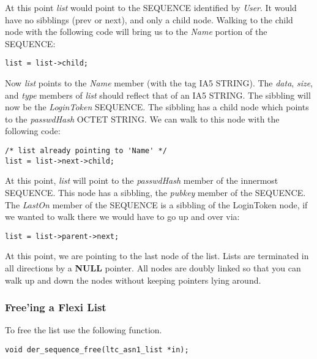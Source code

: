 \documentclass[synpaper]{book}
\begin{document}
At this point \textit{list} would point to the SEQUENCE identified by \textit{User}.  It would have no sibblings (prev or next), and only a child node.  Walking to the child
node with the following code will bring us to the \textit{Name} portion of the SEQUENCE:
\begin{small}
\begin{verbatim}
list = list->child;
\end{verbatim}
\end{small}
Now \textit{list} points to the \textit{Name} member (with the tag IA5 STRING).  The \textit{data}, \textit{size}, and \textit{type} members of \textit{list} should reflect
that of an IA5 STRING.  The sibbling will now be the \textit{LoginToken} SEQUENCE.  The sibbling has a child node which points to the \textit{passwdHash} OCTET STRING.
We can walk to this node with the following code:
\begin{small}
\begin{verbatim}
/* list already pointing to 'Name' */
list = list->next->child;
\end{verbatim}
\end{small}
At this point, \textit{list} will point to the \textit{passwdHash} member of the innermost SEQUENCE.  This node has a sibbling, the \textit{pubkey} member of the SEQUENCE.
The \textit{LastOn} member of the SEQUENCE is a sibbling of the LoginToken node, if we wanted to walk there we would have to go up and over via:
\begin{small}
\begin{verbatim}
list = list->parent->next;
\end{verbatim}
\end{small}
At this point, we are pointing to the last node of the list.  Lists are terminated in all directions by a \textbf{NULL} pointer.  All nodes are doubly linked so that you 
can walk up and down the nodes without keeping pointers lying around.





\subsubsection{Free'ing a Flexi List}
To free the list use the following function.

\begin{verbatim}
void der_sequence_free(ltc_asn1_list *in);
\end{verbatim}
\end{document}

